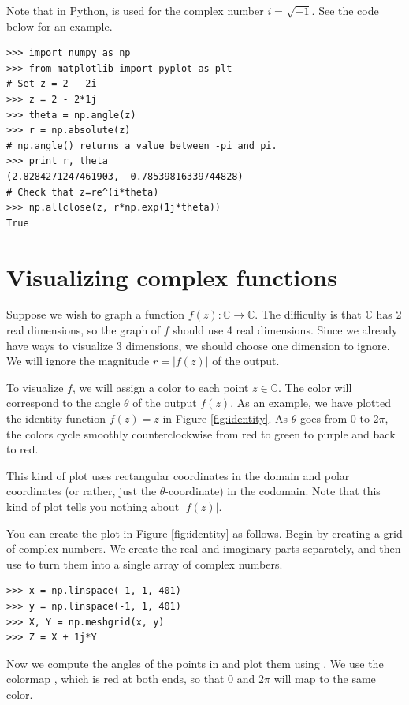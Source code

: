 Note that in Python,  is used for the complex number $i=\sqrt{-1}$.
See the code below for an example.

\begin{lstlisting}
>>> import numpy as np
>>> from matplotlib import pyplot as plt
# Set z = 2 - 2i
>>> z = 2 - 2*1j
>>> theta = np.angle(z)
>>> r = np.absolute(z)
# np.angle() returns a value between -pi and pi.
>>> print r, theta
(2.8284271247461903, -0.78539816339744828)
# Check that z=re^(i*theta)
>>> np.allclose(z, r*np.exp(1j*theta))
True
\end{lstlisting}

\section*{Visualizing complex functions}
Suppose we wish to graph a function $f(z): \mathbb{C} \rightarrow \mathbb{C}$. 
The difficulty is that $\mathbb{C}$ has 2 real dimensions, so the graph of $f$ should use 4 real dimensions.
 Since we already have ways to visualize 3 dimensions, we should choose one dimension to ignore. 
 We will ignore the magnitude $r = |f(z)|$ of the output.

To visualize $f$, we will assign a color to each point $z \in \mathbb{C}$. 
The color will correspond to the angle $\theta$ of the output $f(z)$. 
As an example, we have plotted the identity function $f(z)=z$ in Figure \ref{fig:identity}.
As $\theta$ goes from 0 to $2\pi$, the colors cycle smoothly counterclockwise from red to green to purple and back to red.

This kind of plot uses rectangular coordinates in the domain and polar coordinates (or rather, just the $\theta$-coordinate) in the codomain.
Note that this kind of plot tells you nothing about $|f(z)|$.

You can create the plot in Figure \ref{fig:identity} as follows.
Begin by creating a grid of complex numbers.
We create the real and imaginary parts separately, and then use  to turn them into a single array of complex numbers.
\begin{lstlisting}
>>> x = np.linspace(-1, 1, 401)
>>> y = np.linspace(-1, 1, 401)
>>> X, Y = np.meshgrid(x, y)
>>> Z = X + 1j*Y
\end{lstlisting}

Now we compute the angles of the points in  and plot them using . 
We use the colormap , which is red at both ends, so that $0$ and $2 \pi$ will map to the same color.


